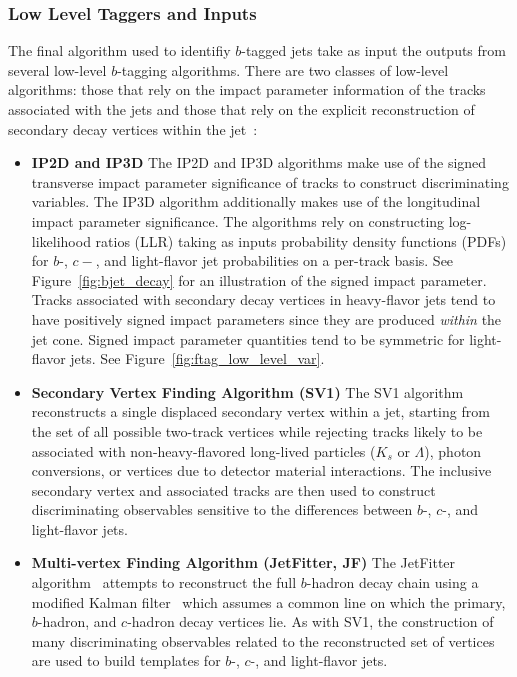 \subsubsection{Low Level Taggers and Inputs}
\label{sec:ftag_low_level}

The final algorithm used to identifiy $b$-tagged jets take as input the outputs from several low-level
$b$-tagging algorithms.
There are two classes of low-level algorithms: those that rely on the impact parameter information of the
tracks associated with the jets and those that rely on the explicit reconstruction of secondary decay vertices
within the jet~\cite{FTAG2019}:

\begin{itemize}
    \item{\textbf{IP2D and IP3D}} The IP2D and IP3D algorithms make use of the signed transverse impact parameter significance of tracks
        to construct discriminating variables. The IP3D algorithm additionally makes use of the longitudinal impact parameter
        significance. The algorithms rely on constructing log-likelihood ratios (LLR) taking as inputs probability density functions (PDFs)
        for $b$-, $c-$, and light-flavor jet probabilities on a per-track basis.
        See Figure~\ref{fig:bjet_decay} for an illustration of the signed impact parameter.
        Tracks associated with secondary decay vertices in heavy-flavor jets tend to have positively signed impact parameters since they
        are produced \textit{within} the jet cone.
        Signed impact parameter quantities tend to be symmetric for light-flavor jets. See Figure~\ref{fig:ftag_low_level_var}.
    \item{\textbf{Secondary Vertex Finding Algorithm (SV1)}} The SV1 algorithm~\cite{SV1} reconstructs a single displaced secondary vertex within
        a jet, starting from the set of all possible two-track vertices while rejecting tracks likely to be associated with
        non-heavy-flavored long-lived particles ($K_s$ or $\Lambda$), photon conversions, or vertices due to detector material interactions.
        The inclusive secondary vertex and associated tracks are then used to construct discriminating observables sensitive to the differences
        between $b$-, $c$-, and light-flavor jets.
    \item{\textbf{Multi-vertex Finding Algorithm (JetFitter, JF)}} The JetFitter algorithm~\cite{JETFITTER} attempts to reconstruct the full
        $b$-hadron decay chain using a modified Kalman filter~\cite{KalmanFilter} which assumes a common line on which the primary, $b$-hadron,
        and $c$-hadron decay vertices lie. As with SV1, the construction of many discriminating observables related to the
        reconstructed set of vertices are used to build templates for $b$-, $c$-, and light-flavor jets.
\end{itemize}

